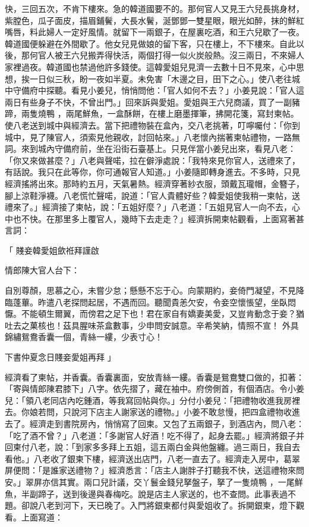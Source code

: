 快，三回五次，不肯下樓來。急的韓道國要不的。那何官人又見王六兒長挑身材，紫膛色，瓜子面皮，描眉鋪鬢，大長水鬢，涎鄧鄧一雙星眼，眼光如醉，抹的鮮紅嘴唇，料此婦人一定好風情。就留下一兩銀子，在屋裏吃酒，和王六兒歇了一夜。韓道國便躲避在外間歇了。他女兒見做娘的留下客，只在樓上，不下樓來。自此以後，那何官人被王六兒搬弄得快活，兩個打得一似火炭般熱。沒三兩日，不來婦人家裡過夜。韓道國也禁過他許多錢使。這韓愛姐兒見濟一去數十日不見來，心中思想，挨一日似三秋，盼一夜如半夏。未免害「木邊之目，田下之心。」使八老往城中守備府中探聽。看見小姜兒，悄悄問他：「官人如何不去？」小姜見說：「官人這兩日有些身子不快，不曾出門。」回來訴與愛姐。愛姐與王六兒商議，買了一副豬蹄，兩隻燒鴨 ，兩尾鮮魚，一盒酥餅，在樓上磨墨揮筆，拂開花箋，寫封柬帖。使八老送到城中與經濟去。當下把禮物裝在盒內，交八老挑著，叮嚀囑付：「你到城中，見了陳官人，須索見他親收，討回帖來。」八老懷內揣著柬帖禮物，一路無詞。來到城內守備府前，坐在沿街石臺基上。只見伴當小姜兒出來，看見八老：「你又來做甚麼？」八老與聲喏，拉在僻淨處說：「我特來見你官人，送禮來了，有話說。我只在此等你，你可通報官人知道。」小姜隨即轉身進去。不多時，只見經濟搖將出來。那時約五月，天氣暑熱。經濟穿著紗衣服，頭戴瓦瓏帽，金簪子，腳上涼鞋淨襪。八老慌忙聲喏，說道：「官人貴體好些？韓愛姐使我稍一柬帖，送禮來了。」經濟接了柬帖，說：「五姐好麼？」八老道：「五姐見官人一向不去，心中也不快。在那里多上覆官人，幾時下去走走？」經濟拆開柬帖觀看，上面寫著甚言詞：

「                        賤妾韓愛姐歛袵拜謹啟

情郎陳大官人台下：

自別尊顏，思慕之心，未嘗少怠；懸懸不忘于心。向蒙期約，妾倚門凝望，不見降臨蓬蓽。昨遣八老探問起居，不遇而回。聽聞貴恙欠安，令妾空懷悵望，坐臥悶懨。不能頓生爾翼，而傍君之足下也！君在家自有嬌妻美愛，又豈肯動念于妾？猶吐去之菓核也！茲具腥味茶盒數事，少申問安誠意。辛希笑納，情照不宣！  外具錦繡鴛鴦香囊一個，青絲一縷，少表寸心！

下書仲夏念日賤妾愛姐再拜  」

經濟看了柬帖，并香囊。香囊裏面，安放青絲一縷。香囊是鴛鴦雙口做的，扣著：「寄與情郎陳君膝下」八字。依先摺了，藏在袖中。府傍側首，有個酒店。令小姜兒：「領八老同店內吃鍾酒，等我寫回帖與你。」分付小姜兒：「把禮物收進我房裡去。你娘若問，只說河下店主人謝家送的禮物。」小姜不敢怠慢，把四盒禮物收進去了。經濟走到書院房內，悄悄寫了回柬。又包了五兩銀子，到酒店內，問八老：「吃了酒不曾？」八老道：「多謝官人好酒！吃不得了，起身去罷。」經濟將銀子并回柬付八老，說：「到家多多拜上五姐，這五兩白金與他盤纏。過三兩日，我自去看他。」八老收了銀柬下樓，經濟送出店門，八老一直去了。經濟走入房中，葛翠屏便問：「是誰家送禮物？」經濟悉言：「店主人謝胖子打聽我不快，送這禮物來問安。」翠屏亦信其實。兩口兒計議，交丫鬟金錢兒拏盤子，拏了一隻燒鴨 ，一尾鮮魚，半副蹄子，送到後邊與春梅吃。說是店主人家送的，也不查問。此事表過不題。卻說八老到河下，天已晚了。入門將銀柬都付與愛姐收了。拆開銀柬，燈下觀看。上面寫道：


